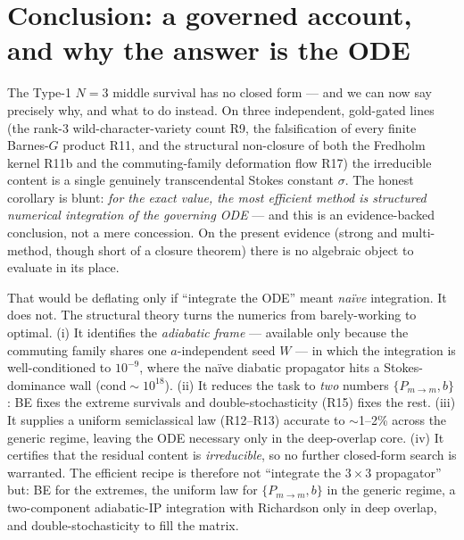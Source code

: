 \documentclass[aps,prd,reprint,nofootinbib]{revtex4-2}
\newcommand{\Pmid}{P_{m\to m}}   %
\begin{document}
\section{Conclusion: a governed account, and why the answer is the ODE}
The Type-1 $N{=}3$ middle survival has no closed form --- and we can now say precisely why, and what to
do instead. On three independent, gold-gated lines (the rank-3 wild-character-variety count R9, the
falsification of every finite Barnes-$G$ product R11, and the structural non-closure of both the Fredholm
kernel R11b and the commuting-family deformation flow R17) the irreducible content is a single genuinely
transcendental Stokes constant $\sigma$. The honest corollary is blunt: \emph{for the exact value, the
most efficient method is structured numerical integration of the governing ODE} --- and this is an
evidence-backed conclusion, not a mere concession. On the present evidence (strong and multi-method,
though short of a closure theorem) there is no algebraic object to evaluate in its place.

That would be deflating only if ``integrate the ODE'' meant \emph{na\"ive} integration. It does not. The
structural theory turns the numerics from barely-working to optimal. (i) It identifies the \emph{adiabatic
frame} --- available only because the commuting family shares one $a$-independent seed $W$ --- in which the
integration is well-conditioned to $10^{-9}$, where the na\"ive diabatic propagator hits a
Stokes-dominance wall ($\mathrm{cond}\sim10^{18}$). (ii) It reduces the task to \emph{two} numbers
$\{\Pmid,b\}$: BE fixes the extreme survivals and double-stochasticity (R15) fixes the rest. (iii) It
supplies a uniform semiclassical law (R12--R13) accurate to $\sim$1--2\% across the generic regime,
leaving the ODE necessary only in the deep-overlap core. (iv) It certifies that the residual content is
\emph{irreducible}, so no further closed-form search is warranted. The efficient recipe is therefore not
``integrate the $3\times3$ propagator'' but: BE for the extremes, the uniform law for $\{\Pmid,b\}$ in the
generic regime, a two-component adiabatic-IP integration with Richardson only in deep overlap, and
double-stochasticity to fill the matrix.
\end{document}
